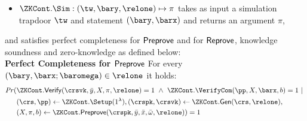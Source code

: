 \begin{definition}[ZK Continuations]
\begin{itemize}
\item $\ZKCont.\Sim: (\tw, \bary, \relone) \mapsto \pi$ takes as input a simulation trapdoor $\tw$ and statement $(\bary, \barx)$ and returns an argument $\pi$,
\end{itemize}
and satisfies perfect completeness for ${\mathsf{Preprove}}$ and for ${\mathsf{Reprove}}$,  knowledge soundness and zero-knowledge as defined below:\\
\noindent \textbf{Perfect Completeness for ${\mathsf{Preprove}}$} For every $(\bary, \barx; \baromega) \in \relone$ it holds:
\begin{align*}
\mathit{Pr} (& \ZKCont.\Verify(\crsvk, \bar{y}, X, \pi, \relone) = 1 \ \wedge \ \ZKCont.\VerifyCom (\pp, X, \barx, b) = 1\  | \ \\ 
                   & (\crs, \pp) \leftarrow \ZKCont.\Setup (1^{\lambda}), (\crspk, \crsvk) \leftarrow \ZKCont.\Gen(\crs, \relone), \\ 
                   & (X, \pi, b) \leftarrow \ZKCont.\Preprove(\crspk, \bar{y}, \bar{x}, \bar{\omega}, \relone)) = 1
\end{align*}


\end{definition}
